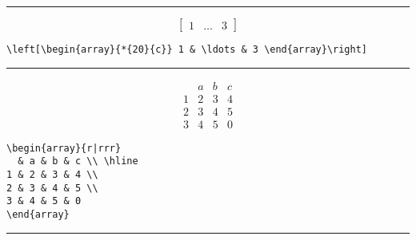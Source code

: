%
%
\begin{center}{\rule{10cm}{0.5pt}}\end{center}
%
$$\left[\begin{array}{*{20}{c}} 1 & \ldots & 3 \end{array}\right] $$\par
%
\begin{center}\verb!\left[\begin{array}{*{20}{c}} 1 & \ldots & 3 \end{array}\right]! \end{center}
%
\begin{center}{\rule{10cm}{0.5pt}}\end{center}
%
$$ \begin{array}{r|rrr}
  & a & b & c \\ \hline
1 & 2 & 3 & 4 \\
2 & 3 & 4 & 5 \\
3 & 4 & 5 & 0
\end{array} $$
%
\begin{center}
\begin{verbatim}
\begin{array}{r|rrr}
  & a & b & c \\ \hline
1 & 2 & 3 & 4 \\
2 & 3 & 4 & 5 \\
3 & 4 & 5 & 0
\end{array}
\end{verbatim}
\end{center}
%
\begin{center}{\rule{10cm}{0.5pt}}\end{center}
%
